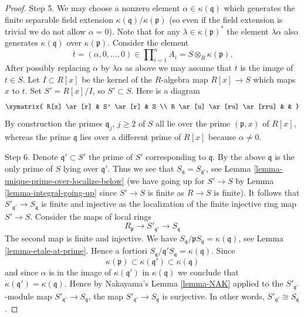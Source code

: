 \begin{proof}
\medskip\noindent
Step 5. We may choose a nonzero element $\alpha \in \kappa(\mathfrak q)$ which
generates the finite separable field extension
$\kappa(\mathfrak q)/\kappa(\mathfrak p)$ (so even if the
field extension is trivial we do not allow $\alpha = 0$).
Note that for any $\lambda \in \kappa(\mathfrak p)^*$ the
element $\lambda \alpha$ also generates $\kappa(\mathfrak q)$
over $\kappa(\mathfrak p)$. Consider the element
$$
\overline{t} =
(\alpha, 0, \ldots, 0) \in
\prod\nolimits_{i = 1}^n A_i =
S \otimes_R \kappa(\mathfrak p).
$$
After possibly replacing $\alpha$ by $\lambda \alpha$ as above
we may assume that $\overline{t}$ is the image of $t \in S$.
Let $I \subset R[x]$ be the kernel of the $R$-algebra
map $R[x] \to S$ which maps $x$ to $t$. Set $S' = R[x]/I$,
so $S' \subset S$. Here is a diagram
$$
\xymatrix{
R[x] \ar[r] & S' \ar[r] & S \\
R \ar[u] \ar[ru] \ar[rru] & &
}
$$
By construction the primes $\mathfrak q_j$, $j \geq 2$ of $S$ all
lie over the prime $(\mathfrak p, x)$ of $R[x]$, whereas
the prime $\mathfrak q$ lies over a different prime of $R[x]$
because $\alpha \not = 0$.

\medskip\noindent
Step 6. Denote $\mathfrak q' \subset S'$ the prime of $S'$
corresponding to $\mathfrak q$. By the above $\mathfrak q$ is
the only prime of $S$ lying over $\mathfrak q'$. Thus we see that
$S_{\mathfrak q} = S_{\mathfrak q'}$, see
Lemma \ref{lemma-unique-prime-over-localize-below} (we have
going up for $S' \to S$ by Lemma \ref{lemma-integral-going-up}
since $S' \to S$ is finite as $R \to S$ is finite).
It follows that $S'_{\mathfrak q'} \to S_{\mathfrak q}$ is finite
and injective as the localization of the finite injective ring map
$S' \to S$. Consider the maps of local rings
$$
R_{\mathfrak p} \to S'_{\mathfrak q'} \to S_{\mathfrak q}
$$
The second map is finite and injective. We have
$S_{\mathfrak q}/\mathfrak pS_{\mathfrak q} = \kappa(\mathfrak q)$,
see Lemma \ref{lemma-etale-at-prime}.
Hence a fortiori
$S_{\mathfrak q}/\mathfrak q'S_{\mathfrak q} = \kappa(\mathfrak q)$.
Since
$$
\kappa(\mathfrak p) \subset \kappa(\mathfrak q') \subset \kappa(\mathfrak q)
$$
and since $\alpha$ is in the image of $\kappa(\mathfrak q')$ in
$\kappa(\mathfrak q)$
we conclude that $\kappa(\mathfrak q') = \kappa(\mathfrak q)$.
Hence by Nakayama's Lemma \ref{lemma-NAK} applied to the
$S'_{\mathfrak q'}$-module map $S'_{\mathfrak q'} \to S_{\mathfrak q}$,
the map $S'_{\mathfrak q'} \to S_{\mathfrak q}$ is surjective.
In other words,
$S'_{\mathfrak q'} \cong S_{\mathfrak q}$.


\end{proof}
